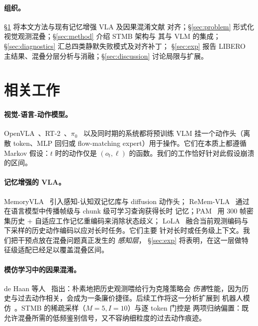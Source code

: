 \documentclass[11pt]{ctexart}
\begin{document}
\paragraph{组织。} \S\ref{sec:related} 将本文方法与现有记忆增强 VLA 及因果混淆文献
对齐；\S\ref{sec:problem} 形式化视觉观测混叠；\S\ref{sec:method} 介绍 STMB 架构与
其与 VLM 的集成；\S\ref{sec:diagnostics} 汇总四类静默失败模式及对齐补丁；
\S\ref{sec:exp} 报告 LIBERO 主结果、混叠分层分析与消融；\S\ref{sec:discussion}
讨论局限与扩展。

\section{相关工作}
\label{sec:related}

\paragraph{视觉-语言-动作模型。}
OpenVLA~\cite{kim2024openvla}、RT-2~\cite{brohan2023rt2}、$\pi_0$~\cite{black2024pi0}
以及同时期的系统都将预训练 VLM 挂一个动作头（离散 token、MLP 回归或 flow-matching
expert）用于操作。它们在本质上都遵循 Markov 假设：$t$ 时的动作仅是 $(o_t, \ell)$
的函数。我们的工作恰好针对此假设崩溃的区间。

\paragraph{记忆增强的 VLA。}
MemoryVLA~\cite{shi2025memoryvla} 引入感知-认知双记忆库与 diffusion 动作头；
ReMem-VLA~\cite{remem2025} 通过在语言模型中传播帧级与 chunk 级可学习查询获得长时
记忆；PAM~\cite{pam2025} 用 300 帧密集历史 + 自适应工作记忆重编码来消除状态歧义；
LoLA~\cite{lola2025} 融合当前观测编码与下采样的历史动作编码以应对长时任务。它们主要
针对长时或任务级上下文。我们把干预点放在混叠问题真正发生的 \emph{感知层}，
\S\ref{sec:exp} 将表明，在这一层做特征级适配已经足以覆盖混叠区间。

\paragraph{模仿学习中的因果混淆。}
de Haan 等人~\cite{dehaan2019causal} 指出：朴素地把历史观测喂给行为克隆策略会
\emph{伤害}性能，因为历史与过去动作相关，会成为一条廉价捷径。后续工作将这一分析扩展到
机器人模仿~\cite{causalbot2025}。STMB 的稀疏采样（$M{=}5, I{=}10$）与逐 token 门控是
两项归纳偏置：既允许混叠所需的低频鉴别信号，又不容纳细粒度的过去动作痕迹。
\end{document}
